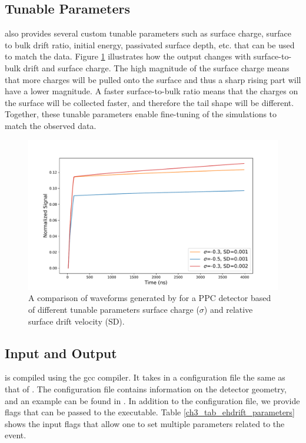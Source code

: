 \subsection{Tunable Parameters}
{\ehd} also provides several custom tunable parameters such as surface charge, surface to bulk drift ratio, initial energy, passivated surface depth, etc. that can be used to match the data. Figure \ref{fig:wf_comp} illustrates how the output changes with surface-to-bulk drift and surface charge. The high magnitude of the surface charge means that more charges will be pulled onto the surface and thus a sharp rising part will have a lower magnitude. A faster surface-to-bulk ratio means that the charges on the surface will be collected faster, and therefore the tail shape will be different. Together, these tunable parameters enable fine-tuning of the simulations to match the observed data.

\begin{figure}%
    \includegraphics[trim={0.1cm 0.3cm 1.3cm 0.3cm},clip,width=0.99\linewidth]{ch3/figs/wf_comp.pdf}
    \caption{A comparison of waveforms generated by {\ehd} for a {\Ltwo} PPC detector based of different tunable parameters surface charge ($\sigma$) and relative surface drift velocity (SD).}
    \label{fig:wf_comp}
\end{figure}


\subsection{Input and Output}
{\ehd} is compiled using the gcc compiler. It takes in a configuration file the same as that of {\siggen}. The configuration file contains information on the detector geometry, and an example can be found in \cite{ehdrift2024}. In addition to the configuration file, we provide flags that can be passed to the executable. Table \ref{ch3_tab_ehdrift_parameters} shows the input flags that allow one to set multiple parameters related to the event.



